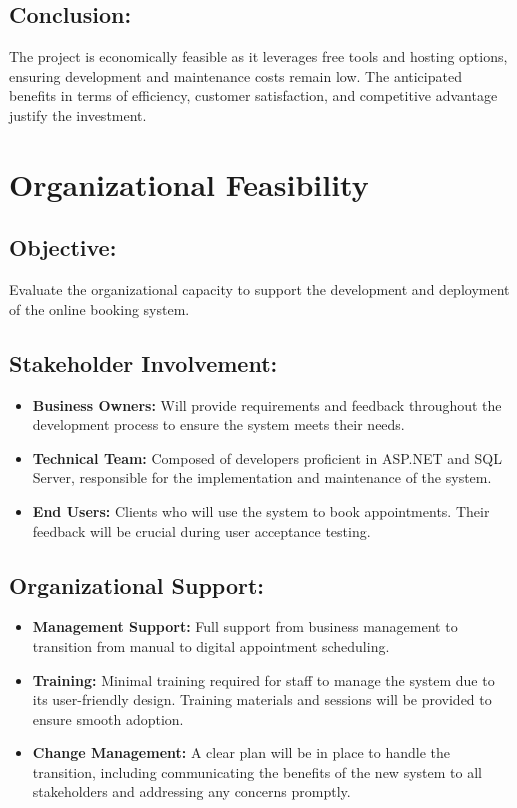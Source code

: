 \subsection*{Conclusion:}
\label{subsec:ef-conclusion}
The project is economically feasible as it leverages free tools and hosting options, ensuring development and maintenance costs remain low. The anticipated benefits in terms of efficiency, customer satisfaction, and competitive advantage justify the investment.

\section{Organizational Feasibility}
\label{sec:organizational-feasibility}

\subsection*{Objective:}
Evaluate the organizational capacity to support the development and deployment of the online booking system.

\subsection*{Stakeholder Involvement:}

\begin{itemize}
    \item \textbf{Business Owners:} Will provide requirements and feedback throughout the development process to ensure the system meets their needs.
    \item \textbf{Technical Team:} Composed of developers proficient in ASP.NET and SQL Server, responsible for the implementation and maintenance of the system.
    \item \textbf{End Users:} Clients who will use the system to book appointments. Their feedback will be crucial during user acceptance testing.
\end{itemize}

\subsection*{Organizational Support:}
\begin{itemize}
    \item \textbf{Management Support:} Full support from business management to transition from manual to digital appointment scheduling.
    \item \textbf{Training:} Minimal training required for staff to manage the system due to its user-friendly design. Training materials and sessions will be provided to ensure smooth adoption.
    \item \textbf{Change Management:} A clear plan will be in place to handle the transition, including communicating the benefits of the new system to all stakeholders and addressing any concerns promptly.
\end{itemize}

